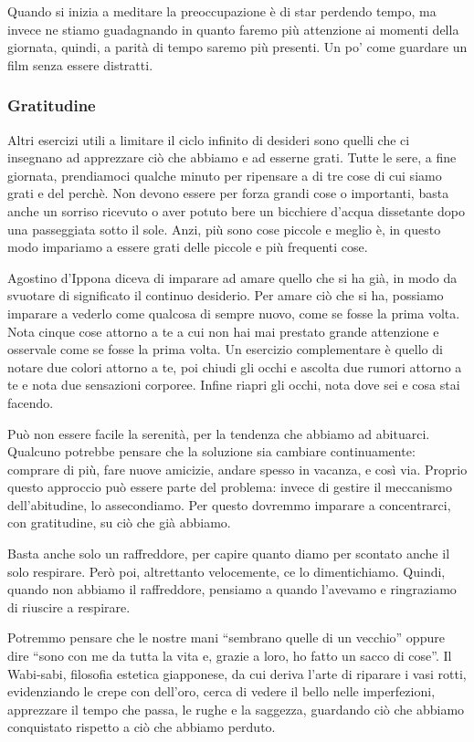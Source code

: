 \documentclass[12pt]{book} %
\begin{document}
Quando si inizia a meditare la preoccupazione è di star perdendo tempo, ma invece ne stiamo guadagnando in quanto faremo più attenzione ai momenti della giornata, quindi, a parità di tempo saremo più presenti. Un po' come guardare un film senza essere distratti.

\subsubsection{Gratitudine}
Altri esercizi utili a limitare il ciclo infinito di desideri sono quelli che ci insegnano ad apprezzare ciò che abbiamo e ad esserne grati. Tutte le sere, a fine giornata, prendiamoci qualche minuto per ripensare a di tre cose di cui siamo grati e del perchè.
Non devono essere per forza grandi cose o importanti, basta anche un sorriso ricevuto o aver potuto bere un bicchiere d'acqua dissetante dopo una passeggiata sotto il sole. Anzi, più sono cose piccole e meglio è, in questo modo impariamo a essere grati delle piccole e più frequenti cose. 

Agostino d'Ippona diceva di imparare ad amare quello che si ha già, in modo da svuotare di significato il continuo desiderio. Per amare ciò che si ha, possiamo imparare a vederlo come qualcosa di sempre nuovo, come se fosse la prima volta. Nota cinque cose attorno a te a cui non hai mai prestato grande attenzione e osservale come se fosse la prima volta. Un esercizio complementare è quello di notare due colori attorno a te, poi chiudi gli occhi e ascolta due rumori attorno a te e nota due sensazioni corporee. Infine riapri gli occhi, nota dove sei e cosa stai facendo.

Può non essere facile la serenità, per la tendenza che abbiamo ad abituarci. Qualcuno potrebbe pensare che la soluzione sia cambiare continuamente: comprare di più, fare nuove amicizie, andare spesso in vacanza, e così via. Proprio questo approccio può essere parte del problema: invece di gestire il meccanismo dell'abitudine, lo assecondiamo. Per questo dovremmo imparare a concentrarci, con gratitudine, su ciò che già abbiamo.

Basta anche solo un raffreddore, per capire quanto diamo per scontato anche il solo respirare. Però poi, altrettanto velocemente, ce lo dimentichiamo. Quindi, quando non abbiamo il raffreddore, pensiamo a quando l'avevamo e ringraziamo di riuscire a respirare.

Potremmo pensare che le nostre mani “sembrano quelle di un vecchio” oppure dire “sono con me da tutta la vita e, grazie a loro, ho fatto un sacco di cose”. Il Wabi-sabi, filosofia estetica giapponese, da cui deriva l'arte di riparare i vasi rotti, evidenziando le crepe con dell'oro, cerca di vedere il bello nelle imperfezioni, apprezzare il tempo che passa, le rughe e la saggezza, guardando ciò che abbiamo conquistato rispetto a ciò che abbiamo perduto.
\end{document}
